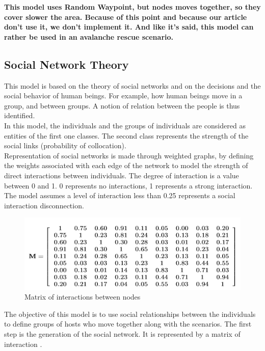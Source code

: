 \textbf{This model uses Random Waypoint, but nodes moves together, so they cover slower the area. Because of this point and because our article don't use it, we don't implement it. And like it's said, this model can rather be used in an avalanche rescue scenario.}

\newpage

\subsection{Social Network Theory}

This model is based on the theory of social networks and on the decisions and the social behavior of human beings. For example, how human beings move in a group, and between groups. A notion of relation between the people is thus identified.\\
In this model, the individuals and the groups of individuals are considered as entities of the first one classes. The second class represents the strength of the social links (probability of collocation).\\

Representation of social networks is made through weighted graphs, by defining the weights associated with each edge of the network to model the strength of direct interactions between individuals. The degree of interaction is a value between 0 and 1. 0 represents no interactions, 1 represents a strong interaction.
The model assumes a level of interaction less than 0.25 represents a social interaction disconnection.

\begin{figure}[h]
\center
\includegraphics{../images/MatrixInteractionSocialNetwork.png}
\caption{\label{MatricSN}Matrix of interactions between nodes\cite{networkTheory5}}
\label{MatricSN}
\end{figure}

The objective of this model is to use social relationships between the individuals to define groups of hosts who move together along with the scenarios.
The first step is the generation of the social network. It is represented by a matrix of interaction \pageref{MatricSN}.\\

